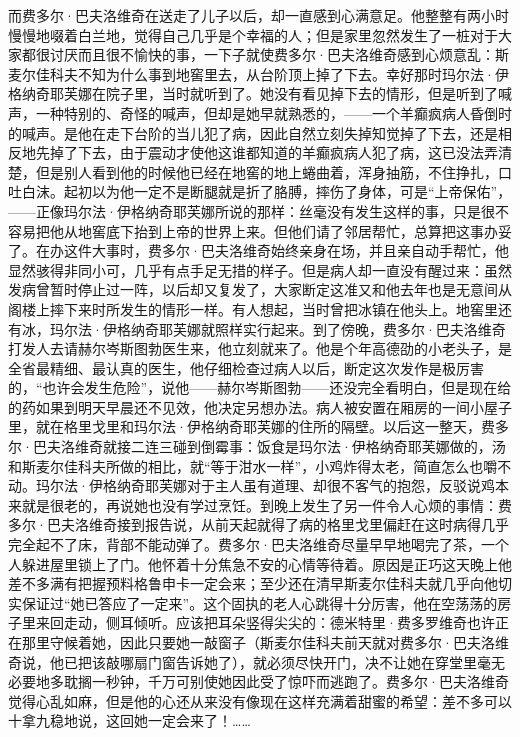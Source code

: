 \par 而费多尔·巴夫洛维奇在送走了儿子以后，却一直感到心满意足。他整整有两小时慢慢地啜着白兰地，觉得自己几乎是个幸福的人；但是家里忽然发生了一桩对于大家都很讨厌而且很不愉快的事，一下子就使费多尔·巴夫洛维奇感到心烦意乱：斯麦尔佳科夫不知为什么事到地窖里去，从台阶顶上掉了下去。幸好那时玛尔法·伊格纳奇耶芙娜在院子里，当时就听到了。她没有看见掉下去的情形，但是听到了喊声，一种特别的、奇怪的喊声，但却是她早就熟悉的，——一个羊癫疯病人昏倒时的喊声。是他在走下台阶的当儿犯了病，因此自然立刻失掉知觉掉了下去，还是相反地先掉了下去，由于震动才使他这谁都知道的羊癫疯病人犯了病，这已没法弄清楚，但是别人看到他的时候他已经在地窖的地上蜷曲着，浑身抽筋，不住挣扎，口吐白沫。起初以为他一定不是断腿就是折了胳膊，摔伤了身体，可是“上帝保佑”，——正像玛尔法·伊格纳奇耶芙娜所说的那样：丝毫没有发生这样的事，只是很不容易把他从地窖底下抬到上帝的世界上来。但他们请了邻居帮忙，总算把这事办妥了。在办这件大事时，费多尔·巴夫洛维奇始终亲身在场，并且亲自动手帮忙，他显然骇得非同小可，几乎有点手足无措的样子。但是病人却一直没有醒过来：虽然发病曾暂时停止过一阵，以后却又复发了，大家断定这准又和他去年也是无意间从阁楼上摔下来时所发生的情形一样。有人想起，当时曾把冰镇在他头上。地窖里还有冰，玛尔法·伊格纳奇耶芙娜就照样实行起来。到了傍晚，费多尔·巴夫洛维奇打发人去请赫尔岑斯图勃医生来，他立刻就来了。他是个年高德劭的小老头子，是全省最精细、最认真的医生，他仔细检查过病人以后，断定这次发作是极厉害的，“也许会发生危险”，说他——赫尔岑斯图勃——还没完全看明白，但是现在给的药如果到明天早晨还不见效，他决定另想办法。病人被安置在厢房的一间小屋子里，就在格里戈里和玛尔法·伊格纳奇耶芙娜的住所的隔壁。以后这一整天，费多尔·巴夫洛维奇就接二连三碰到倒霉事：饭食是玛尔法·伊格纳奇耶芙娜做的，汤和斯麦尔佳科夫所做的相比，就“等于泔水一样”，小鸡炸得太老，简直怎么也嚼不动。玛尔法·伊格纳奇耶芙娜对于主人虽有道理、却很不客气的抱怨，反驳说鸡本来就是很老的，再说她也没有学过烹饪。到晚上发生了另一件令人心烦的事情：费多尔·巴夫洛维奇接到报告说，从前天起就得了病的格里戈里偏赶在这时病得几乎完全起不了床，背部不能动弹了。费多尔·巴夫洛维奇尽量早早地喝完了茶，一个人躲进屋里锁上了门。他怀着十分焦急不安的心情等待着。原因是正巧这天晚上他差不多满有把握预料格鲁申卡一定会来；至少还在清早斯麦尔佳科夫就几乎向他切实保证过“她已答应了一定来”。这个固执的老人心跳得十分厉害，他在空荡荡的房子里来回走动，侧耳倾听。应该把耳朵竖得尖尖的：德米特里·费多罗维奇也许正在那里守候着她，因此只要她一敲窗子（斯麦尔佳科夫前天就对费多尔·巴夫洛维奇说，他已把该敲哪扇门窗告诉她了），就必须尽快开门，决不让她在穿堂里毫无必要地多耽搁一秒钟，千万可别使她因此受了惊吓而逃跑了。费多尔·巴夫洛维奇觉得心乱如麻，但是他的心还从来没有像现在这样充满着甜蜜的希望：差不多可以十拿九稳地说，这回她一定会来了！……





